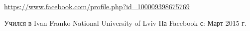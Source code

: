  
 
 
 
 

\url{https://www.facebook.com/profile.php?id=100009398675769}\par
Учился в Ivan Franko National University of Lviv
На Facebook с: Март 2015 г.
